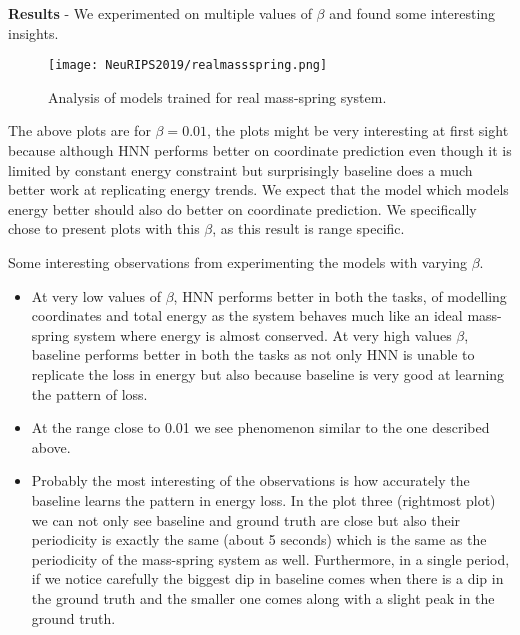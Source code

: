 \documentclass{article}
\begin{document}
\textbf{Results} - We experimented on multiple values of \(\beta\) and found some interesting insights.

\begin{figure}[htp]
    \centering
    \texttt{[image: NeuRIPS2019/realmassspring.png]}
    \caption{Analysis of models trained for real mass-spring system.}
    \label{fig:galaxy}
\end{figure}

The above plots are for \(\beta = 0.01\), the plots might be very interesting at first sight because although HNN performs better on coordinate prediction even though it is limited by constant energy constraint but surprisingly baseline does a much better work at replicating energy trends. We expect that the model which models energy better should also do better on coordinate prediction. We specifically chose to present plots with this \(\beta\), as this result is range specific.

Some interesting observations from experimenting the models with varying \(\beta\).
\begin{itemize}
  \item At very low values of \(\beta\), HNN performs better in both the tasks, of modelling coordinates and total energy as the system behaves much like an ideal mass-spring system where energy is almost conserved. At very high values \(\beta\), baseline performs  better in both the tasks as not only HNN is unable to replicate the loss in energy but also because baseline is very good at learning the pattern of loss.
  \item At the range close to 0.01 we see phenomenon similar to the one described above.
  \item Probably the most interesting of the observations is how accurately the baseline learns the pattern in energy loss. In the plot three (rightmost plot) we can not only see baseline and ground truth are close but also their periodicity is exactly the same (about 5 seconds) which is the same as the periodicity of the mass-spring system as well. Furthermore, in a single period, if we notice carefully the biggest dip in baseline comes when there is a dip in the ground truth and the smaller one comes along with a slight peak in the ground truth.
\end{itemize}
\end{document}

